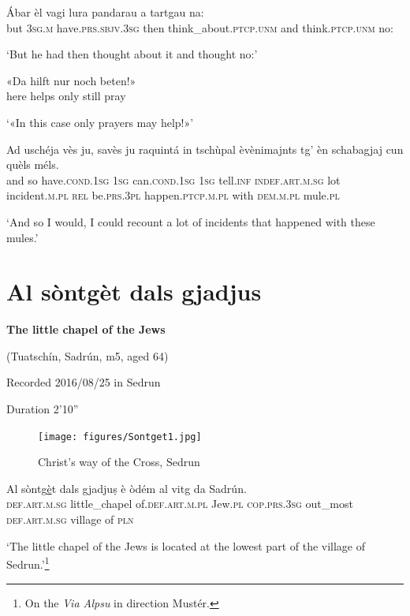\begin{linenumbers}
\gll   Ábar èl vagi lura pandarau a tartgau na: \\
but \textsc{3sg.m} have.\textsc{prs.sbjv.3sg} then think\_about.\textsc{ptcp.unm} and think.\textsc{ptcp.unm} no: \\
\end{linenumbers}
\medskip
\glt `But he had then thought about it and thought no:'
\medskip

\begin{linenumbers}
\gll«Da hilft nur noch beten!»\footnotemark\\
here helps only still pray\\
\end{linenumbers}
\medskip
\glt `«In this case only prayers may help!»'
\medskip

\begin{linenumbers}
\gll  Ad uschéja vès ju, savès ju raquintá in tschùpal èvènimajnts tg’ èn schabagjaj cun quèls méls.  \\
and so have.\textsc{cond.1sg} \textsc{1sg} can.\textsc{cond.1sg} \textsc{1sg} tell.\textsc{inf} \textsc{indef.art.m.sg} lot incident.\textsc{m.pl} \textsc{rel} be.\textsc{prs.3pl} happen.\textsc{ptcp.m.pl} with \textsc{dem.m.pl} mule.\textsc{pl}\\
\end{linenumbers}
\medskip
\glt `And so I would, I could recount a lot of incidents that happened with these mules.'
\medskip

\section{Al sòntgèt dals gjadjus}
\textbf{The little chapel of the Jews}

\noindent
(Tuatschín, Sadrún, m5, aged 64)

\noindent
Recorded 2016/08/25 in Sedrun

\noindent
Duration 2'10''

\bigskip

\begin{figure}
	\texttt{[image: figures/Sontget1.jpg]}
	\caption{Christ's way of the Cross, Sedrun}
	\end{figure}

\begin{linenumbers}
\gll Al sòntg\underline{è}t dals gjadjuṣ è òdém al vitg da Sadrún.\\
 \textsc{def.art.m.sg} little\_chapel of.\textsc{def.art.m.pl} Jew.\textsc{pl} \textsc{cop.prs.3sg}  out\_most \textsc{def.art.m.sg} village of \textsc{pln} \\
\end{linenumbers}
\medskip
\glt `The little chapel of the Jews is located at the lowest part of the village of Sedrun.'\footnote{On the \textit{Via Alpsu} in direction Mustér.}
\medskip


